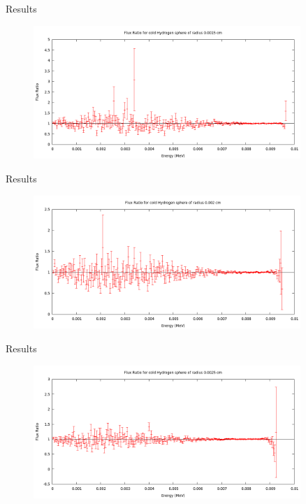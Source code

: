 \documentclass{beamer}
\begin{document}
\begin{frame}{Results}

  \begin{figure}
     \centering
     \includegraphics[width = 0.9\textwidth]{./Sphere3.png}
  \end{figure}


\end{frame}

\begin{frame}{Results}

  \begin{figure}
     \centering
     \includegraphics[width = 0.9\textwidth]{./Sphere4.png}
  \end{figure}


\end{frame}

\begin{frame}{Results}

  \begin{figure}
     \centering
     \includegraphics[width = 0.9\textwidth]{./Sphere5.png}
  \end{figure}


\end{frame}
\end{document}
